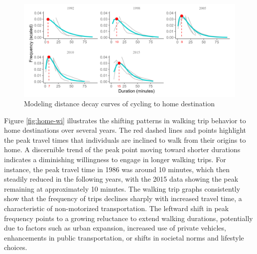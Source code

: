 \documentclass[
11pt, %
oneside, %
english, %
singlespacing, %
]{macthesis} %
\begin{document}
\newpage
\begin{landscape}
\centering
\begin{figure}
\includegraphics[width=1.1\linewidth]{figure/ch03-Fig04} \caption{Modeling distance decay curves of cycling to home destination}\label{fig:home-ci}
\end{figure}
\end{landscape}
\clearpage

Figure \ref{fig:home-wi} illustrates the shifting patterns in walking trip behavior to home destinations over several years. The red dashed lines and points highlight the peak travel times that individuals are inclined to walk from their origins to home. A discernible trend of the peak point moving toward shorter durations indicates a diminishing willingness to engage in longer walking trips. For instance, the peak travel time in 1986 was around 10 minutes, which then steadily reduced in the following years, with the 2015 data showing the peak remaining at approximately 10 minutes. The walking trip graphs consistently show that the frequency of trips declines sharply with increased travel time, a characteristic of non-motorized transportation. The leftward shift in peak frequency points to a growing reluctance to extend walking durations, potentially due to factors such as urban expansion, increased use of private vehicles, enhancements in public transportation, or shifts in societal norms and lifestyle choices.
\end{document}
